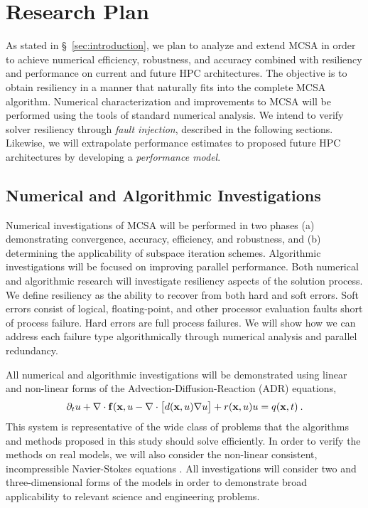 \section{Research Plan}
\label{sec:research-plan}

As stated in \S~\ref{sec:introduction}, we plan to analyze and extend MCSA in
order to achieve numerical efficiency, robustness, and accuracy combined with
resiliency and performance on current and future HPC architectures.  The
objective is to obtain resiliency in a manner that naturally fits into the
complete MCSA algorithm.  Numerical characterization and improvements to MCSA
will be performed using the tools of standard numerical analysis.  We intend to
verify solver resiliency through \textit{fault injection},
described in the following sections.  Likewise, we will extrapolate
performance estimates to proposed future HPC architectures by developing a
\textit{performance model}.


\subsection{Numerical and Algorithmic Investigations}
\label{sec:numer-char}

Numerical investigations of MCSA will be performed in two phases (a)
demonstrating convergence, accuracy, efficiency, and robustness, and (b)
determining the applicability of subspace iteration schemes.  
Algorithmic investigations will
be focused on improving parallel performance.  Both numerical and algorithmic
research will investigate resiliency aspects of the solution process.  
We define resiliency as the ability to
recover from both hard and soft errors.  Soft errors consist of logical,
floating-point, and other processor evaluation faults short of process
failure.  Hard errors are full process failures.  We will show how we can
address each failure type algorithmically through numerical analysis and
parallel redundancy.

All numerical and algorithmic investigations will be demonstrated using
linear and non-linear forms of the Advection-Diffusion-Reaction (ADR) equations,
\begin{equation}
  \partial_t u+ \nabla \cdot\mathbf{f}(\mathbf{x},u - \nabla \cdot\bigl[
  d(\mathbf{x},u)\nabla u\bigr] + r(\mathbf{x},u)u = q(\mathbf{x},t)\:.
\end{equation}
This system is representative of the wide class of problems that the
algorithms and methods proposed in this study should solve efficiently.  In
order to verify the methods on real models, we will also consider the
non-linear consistent, incompressible Navier-Stokes equations
\cite{Evans:2006dd,Evans:2007el,Pernice:2001th}. All investigations will
consider two and three-dimensional forms of the models in order to demonstrate
broad applicability to relevant science and engineering problems.


